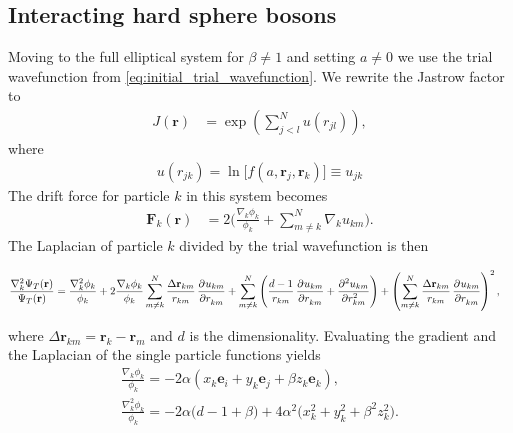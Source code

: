 \documentclass[
    a4paper, aps, twocolumn, floatfix, superscriptaddress,
    nofootinbib]{revtex4-1}
\newcommand{\vf}{\mathbf}
\newcommand{\1}{\mathds{1}}
\newcommand{\para}[1]{\left(#1\right)}
\begin{document}
    \subsection{Interacting hard sphere bosons}
        Moving to the full elliptical system for $\beta \neq 1$ and setting $a
        \neq 0$ we use the trial wavefunction from
        \autoref{eq:initial_trial_wavefunction}. We rewrite the Jastrow factor
        to
        \begin{align}
            J(\vf{r})
            &=
            \exp\para{
                \sum_{j < l}^N u(r_{jl})
            },
        \end{align}
        where
        \begin{align}
            u(r_{jk})
            = \ln\bigl[f(a, \vf{r}_j, \vf{r}_k)\bigr]
            \equiv u_{jk}
        \end{align}
        The drift force for particle $k$ in this system becomes
        \begin{align}
            \vf{F}_k(\vf{r})
            &=
            2\Biggl(
                \frac{\nabla_k\phi_k}{\phi_k}
                + \sum_{m \neq k}^N
                \nabla_k u_{km}
            \Biggr).
        \end{align}
        The Laplacian of particle $k$ divided by the trial wavefunction is then
        \begin{widetext}
            \begin{align}
                \frac{\nabla_k^2\Psi_T(\vf{r})}{\Psi_T(\vf{r})}
                &=
                \frac{\nabla_k^2\phi_k}{\phi_k}
                + 2\frac{\nabla_k\phi_k}{\phi_k}
                \sum_{m \neq k}^N
                \frac{\Delta\vf{r}_{km}}{r_{km}}
                \dpd[]{u_{km}}{r_{km}}
                + \sum_{m\neq k}^N
                \para{
                    \frac{d - 1}{r_{km}}\dpd[]{u_{km}}{r_{km}}
                    + \dpd[2]{u_{km}}{r_{km}}
                }
                +
                \para{
                    \sum_{m \neq k}^N
                    \frac{\Delta\vf{r}_{km}}{r_{km}}
                    \dpd[]{u_{km}}{r_{km}}
                }^2,
                \label{eq:laplacian_full_system}
            \end{align}
        \end{widetext}
        where $\Delta \vf{r}_{km} = \vf{r}_k - \vf{r}_m$ and $d$ is the
        dimensionality. Evaluating the gradient and the Laplacian of the single
        particle functions yields
        \begin{gather}
            \frac{\nabla_k\phi_k}{\phi_k}
            =
            -2\alpha
            (x_k\vf{e}_i + y_k\vf{e}_j + \beta z_k\vf{e}_k),
            \\
            \frac{\nabla_k^2\phi_k}{\phi_k}
            =
            -2\alpha
            \big(
                d - 1 + \beta
            \bigr)
            + 4\alpha^2
            \bigl(
                x_k^2 + y_k^2 + \beta^2z_k^2
            \bigr).
        \end{gather}
\end{document}
